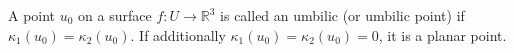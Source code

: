 A point $u_0$ on a surface $f: U \to \mathbb{R}^3$ is called an umbilic (or umbilic point) if $\kappa_1(u_0) = \kappa_2(u_0)$. If additionally $\kappa_1(u_0) = \kappa_2(u_0) = 0$, it is a planar point.